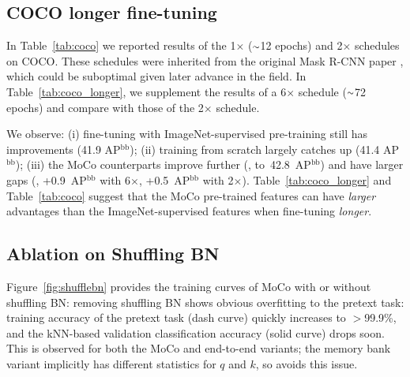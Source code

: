 \documentclass[10pt,twocolumn,letterpaper]{article}
\newcommand{\app}{\raise.17ex\hbox{$\scriptstyle\sim$}}
\newcommand{\apbbox}[1]{AP$^\text{bb}_\text{#1}$}
\begin{document}
\begin{table}[t]
\vspace{.3em}
\caption{Object detection and instance segmentation fine-tuned on COCO: \textbf{2$\times$ $\times$ schedule}. In the brackets are the gaps to the ImageNet supervised pre-training counterpart. In green are the gaps of at least {\fontsize{8pt}{1em}\selectfont \hl{${+}$\textbf{0.5}}} point.
}
\label{tab:coco_longer}
\vspace{-1.em}
\end{table}

\subsection{COCO longer fine-tuning}

In Table~\ref{tab:coco} we reported results of the 1$\times$ ($\app$12 epochs) and 2$\times$ schedules on COCO. These schedules were inherited from the original Mask R-CNN paper \cite{He2017}, which could be suboptimal given later advance in the field. In Table~\ref{tab:coco_longer}, we supplement the results of a 6$\times$ schedule ($\app$72 epochs) \cite{He2019} and compare with those of the 2$\times$ schedule.

We observe: (i) fine-tuning with ImageNet-supervised pre-training still has improvements (41.9 \apbbox{}); (ii) training from scratch largely catches up (41.4 \apbbox{}); (iii) the MoCo counterparts improve further (\eg, \mbox{to 42.8~\apbbox{}}) and have larger gaps (\eg, +0.9~\apbbox{} with 6$\times$, \vs +0.5~\apbbox{} with 2$\times$). 
Table~\ref{tab:coco_longer} and Table~\ref{tab:coco} suggest that the MoCo pre-trained features can have \emph{larger} advantages than the ImageNet-supervised features when fine-tuning \emph{longer}.

\subsection{Ablation on Shuffling BN}

Figure~\ref{fig:shufflebn} provides the training curves of MoCo with or without shuffling BN:
removing shuffling BN shows obvious overfitting to the pretext task: training accuracy of the pretext task (dash curve) quickly increases to $>$99.9\%, and the kNN-based validation classification accuracy (solid curve) drops soon.
This is observed for both the MoCo and end-to-end variants; the memory bank variant implicitly has different statistics for $q$ and $k$, so avoids this issue.
\end{document}
